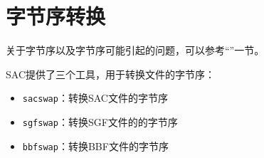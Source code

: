 \section{字节序转换}
\label{sec:bbfswap}
\label{sec:sacswap}
\label{sec:sgfswap}

关于字节序以及字节序可能引起的问题，可以参考``''一节。

SAC提供了三个工具，用于转换文件的字节序：
\begin{itemize}
\item \verb+sacswap+：转换SAC文件的字节序
\item \verb+sgfswap+：转换SGF文件的的字节序
\item \verb+bbfswap+：转换BBF文件的字节序
\end{itemize}
